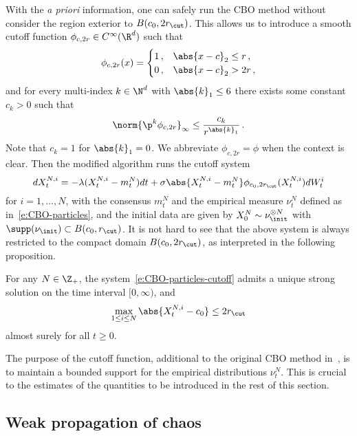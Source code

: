 \documentclass{amsart}
\begin{document}
With the \textit{a priori} information, one can safely run the CBO method without consider the region exterior to $B(c_0, 2r_\cut)$. 
This allows us to introduce a smooth cutoff function $\phi_{c,2r} \in C^\infty(\R^d)$ such that 
\begin{equation*}
	\phi_{c,2r}(x) = \begin{cases}
		1 \,, & \abs{x-c}_2 \le r \,, \\
		0 \,, & \abs{x-c}_2 > 2r \,,
	\end{cases}
\end{equation*} 
and for every multi-index $k \in \N^d$ with $\abs{k}_1 \le 6$ there exists some constant $c_k > 0$ such that 
\begin{equation*}
    \norm{\p^k \phi_{c,2r}}_\infty \le \frac{c_k}{r^{\abs{k}_1}} \,.
\end{equation*}
Note that $c_k = 1$ for $\abs{k}_1 = 0$.
We abbreviate $\phi_{c,2r} = \phi $ when the context is clear. 
Then the modified algorithm runs the cutoff system 
\begin{equation}
	\label{e:CBO-particles-cutoff}
	d X^{N,i}_t = - \lambda (X^{N,i}_t - m^N_t) dt + \sigma \abs{X^{N,i}_t - m^N_t} \phi_{c_0,2r_\cut}(X^{N,i}_t) dW^i_t 
\end{equation}
for $i=1,\dots,N$, with the consensus $m^N_t$ and the empirical measure $\nu^N_t$ defined as in~\eqref{e:CBO-particles}, and the initial data are given by $X^N_0 \sim \nu_\init^{\otimes N}$ with $\supp(\nu_\init) \subset B(c_0, r_\cut)$.
It is not hard to see that the above system is always restricted to the compact domain $B(c_0, 2r_\cut)$, as interpreted in the following proposition. 
\begin{proposition}
	\label{pp:CBO-restrict}
    For any $N \in \Z_+$, the system~\eqref{e:CBO-particles-cutoff} admits a unique strong solution on the time interval $[0,\infty)$, and 
    \begin{equation*}
        \max_{1 \le i\le N} \abs{X^{N,i}_t - c_0} \le 2r_\cut
    \end{equation*}
	almost surely for all $t \ge 0$. 
\end{proposition}
The purpose of the cutoff function, additional to the original CBO method in~\cite{CarriloChoiTotzeckTse2018,FornasierKlockRiedl2021}, is to maintain a bounded support for the empirical distributions $\nu^N_t$.
This is crucial to the estimates of the quantities to be introduced in the rest of this section.



\subsection{Weak propagation of chaos}
\end{document}
